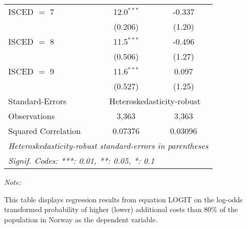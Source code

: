 \begin{table}[htbp!]
\begin{adjustbox}{width = 1\textwidth, max height = 0.95\textheight, center}
\begin{threeparttable}[b]
\begin{tabular}{lcc}
            ISCED $=$ 7          & 12.0$^{***}$   & -0.337\\   
                                 & (0.206)        & (1.20)\\   
            ISCED $=$ 8          & 11.5$^{***}$   & -0.496\\   
                                 & (0.506)        & (1.27)\\   
            ISCED $=$ 9          & 11.6$^{***}$   & 0.097\\   
                                 & (0.527)        & (1.25)\\   
            \midrule 
            Standard-Errors & \multicolumn{2}{c}{Heteroskedasticity-robust} \\ 
            Observations         & 3,363          & 3,363\\  
            Squared Correlation  & 0.07376        & 0.03096\\  
            \midrule \midrule
            \multicolumn{3}{l}{\emph{Heteroskedasticity-robust standard-errors in parentheses}}\\
            \multicolumn{3}{l}{\emph{Signif. Codes: ***: 0.01, **: 0.05, *: 0.1}}\\
         \end{tabular}
         
         \begin{tablenotes}\item \medskip \textit{Note:}
            \item This table displays regression results from equation LOGIT on the log-odds transformed probability of higher (lower) additional costs than 80\% of the population in Norway as the dependent variable. 
         \end{tablenotes}
      \end{threeparttable}
   \end{adjustbox}
\end{table}


